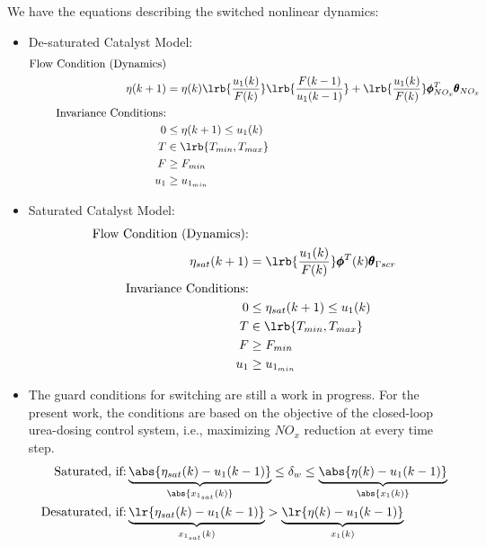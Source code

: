 We have the equations describing the switched nonlinear dynamics:
\begin{itemize}
\item De-saturated Catalyst Model:
\begin{align*}
        \text{Flow Condition (Dynamics)} &\\
                \eta(k+1) &= \eta(k) \lrb{\frac{u_1(k)}{F(k)}} \lrb{\frac{F(k-1)}{u_1(k-1)}}
        +\lrb{\frac{u_1(k)}{F(k)}} \pmb \phi_{NO_x}^T \pmb \theta_{NO_x}                    \\
        \text{Invariance Conditions:} & \\
                0 &\leq \eta (k+1) \leq u_1(k)\\
                T &\in \lrb{T_{min}, T_{max}}\\
                F &\geq F_{min}\\
                u_1 &\geq u_{1_{min}}
\end{align*}
\item Saturated Catalyst Model:
\begin{align*}
        \text{Flow Condition (Dynamics):} & \\
                \eta_{sat}(k+1) &= \lrb{\frac{u_1(k)}{F(k)}} \pmb \phi^T(k) \pmb \theta_{\Gamma scr}\\
        \text{Invariance Conditions:} & \\
                0 &\leq \eta_{sat} (k+1) \leq u_1(k)\\
                T &\in \lrb{T_{min}, T_{max}}\\
                F &\geq F_{min}\\
                u_1 &\geq u_{1_{min}}
\end{align*}

\item The guard conditions for switching are still a work in progress. For the present work, the conditions are based on the objective of the closed-loop urea-dosing control system, i.e., maximizing $NO_x$ reduction at every time step.
\begin{align*}
        \text{Saturated, if:} & \underbrace{\abs{\eta_{sat}(k) - u_1(k-1)}}_{\abs{{x_{1_{sat}}(k)}}} \leq \delta_w
                                \leq \underbrace{\abs{\eta(k) - u_1(k-1)}}_{\abs{x_1(k)}} \\
        \text{Desaturated, if:} & \underbrace{\lr{ \eta_{sat}(k) - u_1(k-1)}}_{x_{1_{sat}}(k)} > \underbrace{\lr{\eta(k) - u_1(k-1)}}_{x_1(k)}
\end{align*}
\end{itemize}

